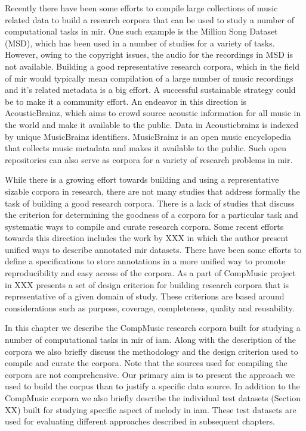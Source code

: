 Recently there have been some efforts to compile large collections of music related data to build a research corpora that can be used to study a number of computational tasks in \gls{mir}. One such example is the Million Song Dataset (MSD), which has been used in a number of studies for a variety of tasks. However, owing to the copyright issues, the audio for the recordings in MSD is not available. Building a good representative research corpora, which in the field of \gls{mir} would typically mean compilation of a large number of music recordings and it's related metadata is a big effort. A successful sustainable strategy could be to make it a community effort. An endeavor in this direction is AcousticBrainz, which aims to crowd source acoustic information for all music in the world and make it available to the public. Data in Acousticbrainz is indexed by unique MusicBrainz identifiers. MusicBrainz is an open music encyclopedia that collects music metadata and makes it available to the public. Such open repositories can also serve as corpora for a variety of research problems in \gls{mir}. 


While there is a growing effort towards building and using a representative sizable corpora in research, there are not many studies that address formally the task of building a good research corpora. There is a lack of studies that discuss the criterion for determining the goodness of a corpora for a particular task and systematic ways to compile and curate research corpora. Some recent efforts towards this direction includes the work by XXX in which the author present unified ways to describe annotated \Gls{mir} datasets. There have been some efforts to define a specifications to store annotations in a more unified way to promote reproducibility and easy access of the corpora. As a part of CompMusic project in XXX presents a set of design criterion for building research corpora that is representative of a given domain of study. These criterions are based around considerations such as purpose, coverage, completeness, quality and reusability. 


In this chapter we describe the CompMusic research corpora built for studying a number of computational tasks in \gls{mir} of \gls{iam}. Along with the description of the corpora we also briefly discuss the methodology  and the design criterion used to compile and curate the corpora. Note that the sources used for compiling the corpora are not comprehensive. Our primary aim is to present the approach we used to build the corpus than to justify a specific data source. In addition to the CompMusic corpora we also briefly describe the individual test datasets (Section XX) built for studying specific aspect of melody in \gls{iam}. These test datasets are used for evaluating different approaches described in subsequent chapters. 

